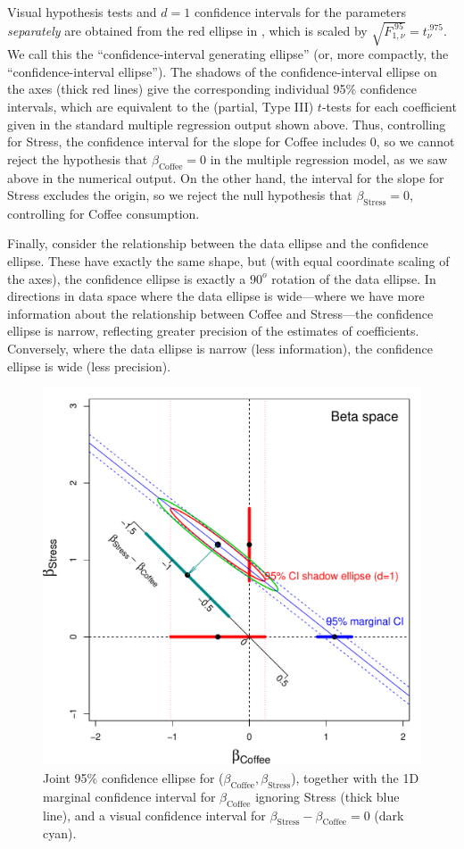 Visual hypothesis tests and $d=1$ confidence intervals for the parameters \emph{separately}
are obtained from the red ellipse in ,
which is scaled by $\sqrt{F^{.95}_{1, \nu}} = t^{.975}_\nu$. We call this the ``confidence-interval generating ellipse'' (or, more compactly, the ``confidence-interval ellipse'').
The shadows of the confidence-interval ellipse on the axes (thick red lines) give the
corresponding individual 95\% confidence intervals, which are
equivalent to the (partial, Type III) $t$-tests for each coefficient given in the
standard multiple regression output shown above.
Thus, controlling for Stress, the confidence interval for the slope for Coffee includes 0,
so we cannot reject the hypothesis that $\beta_{\mathrm{Coffee}}=0$
in the multiple regression model, as we saw above in the numerical output.
On the other hand, the interval for the slope for Stress excludes the origin,
so we reject the null hypothesis that $\beta_{\mathrm{Stress}}=0$,
controlling for Coffee consumption.

Finally, consider the relationship between the data ellipse and the
confidence ellipse.  These have exactly the same shape, but
(with equal coordinate scaling of the axes), the confidence ellipse
is exactly a $90^o$ rotation of the data ellipse.  In directions in
data space where the data ellipse is wide---where we have more information
about the relationship between Coffee and Stress---the confidence ellipse is
narrow, reflecting greater precision of the estimates of coefficients.
Conversely, where the data ellipse is narrow (less information), the
confidence ellipse is wide (less precision).

\begin{figure}[htb]
  \centering
  \includegraphics[width=.6\textwidth,clip]{fig/vis-reg-coffee13}
  \caption{Joint 95\% confidence ellipse for ($\beta_{\mathrm{Coffee}}, \beta_{\mathrm{Stress}}$),
  together with the 1D marginal confidence interval for $\beta_{\mathrm{Coffee}}$
  ignoring Stress (thick blue line), and a visual confidence interval for $\beta_{\mathrm{Stress}} - \beta_{\mathrm{Coffee}}=0$
  (dark cyan).
  }%
  \label{fig:vis-reg-coffee13}
\end{figure}

